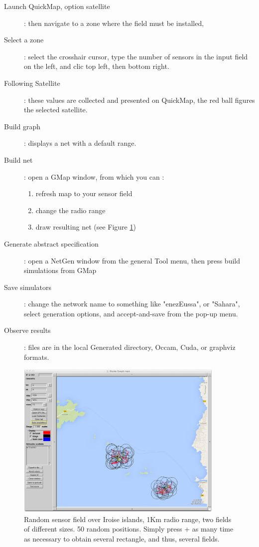 \begin{description}
\item [Launch QuickMap, option satellite] : then navigate to a zone where the field must be installed,
\item [Select a zone ]: select the crosshair cursor, type the number of sensors in the input field on the left, and clic top left, then bottom right.
\item [Following Satellite ]: these values are collected and presented on QuickMap, the red ball figures the selected satellite.
\item [Build graph ]:  displays a net with a default range.
\item [Build net ]:  open a GMap window, from which you can :
\begin{enumerate}
\item refresh map to your sensor field
\item change the radio range
\item draw resulting net (see Figure \ref{fig:enezEussa})
\end{enumerate}
\item [Generate abstract specification ]: open a NetGen window from the general Tool menu, then press build simulations from GMap
\item [Save simulators ]: change the network name to something like "enezEussa", or "Sahara", select generation options, and accept-and-save from the pop-up menu.
\item [Observe results ]:  files are in the local Generated directory, Occam, Cuda, or graphviz formats.
\end{description}



\begin{figure}[hbtp]
\begin{center}
\includegraphics[width=10cm]{MolenePlus.png}
\caption{Random sensor field over Iroise islands, 1Km radio range, two fields of different sizes. 50 random positions.
Simply press + as many time as necessary to obtain several rectangle, and thus, several fields. }
\label{fig:enezEussa}
\end{center}
\end{figure}
